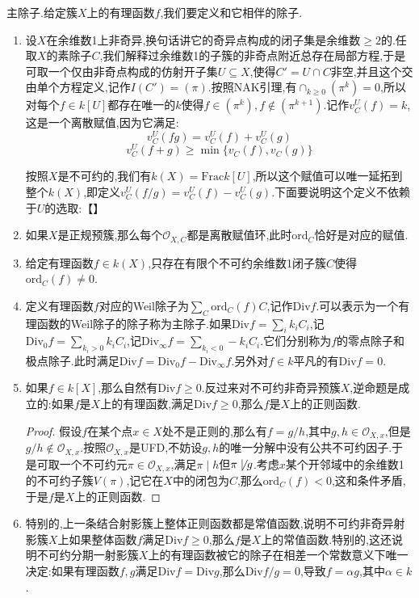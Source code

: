 主除子.给定簇$X$上的有理函数$f$,我们要定义和它相伴的除子.
\begin{enumerate}
	\item 设$X$在余维数1上非奇异,换句话讲它的奇异点构成的闭子集是余维数$\ge2$的.任取$X$的素除子$C$,我们解释过余维数1的子簇的非奇点附近总存在局部方程,于是可取一个仅由非奇点构成的仿射开子集$U\subseteq X$,使得$C'=U\cap C$非空,并且这个交由单个方程定义,记作$I(C')=(\pi)$.按照NAK引理,有$\cap_{k\ge0}(\pi^k)=0$,所以对每个$f\in k[U]$都存在唯一的$k$使得$f\in(\pi^k),f\not\in(\pi^{k+1})$.记作$v_C^U(f)=k$,这是一个离散赋值,因为它满足:
	$$v_C^U(fg)=v_C^U(f)+v_C^U(g)$$
	$$v_C^U(f+g)\ge\min\{v_C(f),v_C(g)\}$$
	
	按照$X$是不可约的,我们有$k(X)=\mathrm{Frac}k[U]$,所以这个赋值可以唯一延拓到整个$k(X)$,即定义$v_C^U(f/g)=v_C^U(f)-v_C^U(g)$.下面要说明这个定义不依赖于$U$的选取:【】
	\item 如果$X$是正规预簇,那么每个$\mathscr{O}_{X,C}$都是离散赋值环,此时$\mathrm{ord}_C$恰好是对应的赋值.
	\item 给定有理函数$f\in k(X)$,只存在有限个不可约余维数1闭子簇$C$使得$\mathrm{ord}_C(f)\not=0$.
	\item 定义有理函数$f$对应的Weil除子为$\sum_C\mathrm{ord}_C(f)C$,记作$\mathrm{Div}f$.可以表示为一个有理函数的Weil除子的除子称为主除子.如果$\mathrm{Div}f=\sum_ik_iC_i$,记$\mathrm{Div}_0f=\sum_{k_i>0}k_iC_i$,记$\mathrm{Div}_{\infty}f=\sum_{k_i<0}-k_iC_i$.它们分别称为$f$的零点除子和极点除子.此时满足$\mathrm{Div}f=\mathrm{Div}_0f-\mathrm{Div}_{\infty}f$.另外对$f\in k$平凡的有$\mathrm{Div}f=0$.
	\item 如果$f\in k[X]$,那么自然有$\mathrm{Div}f\ge0$.反过来对不可约非奇异预簇$X$,逆命题是成立的:如果$f$是$X$上的有理函数,满足$\mathrm{Div}f\ge0$,那么$f$是$X$上的正则函数.
	\begin{proof}
		
		假设$f$在某个点$x\in X$处不是正则的,那么有$f=g/h$,其中$g,h\in\mathscr{O}_{X,x}$,但是$g/h\not\in\mathscr{O}_{X,x}$.按照$\mathscr{O}_{X,x}$是UFD,不妨设$g,h$的唯一分解中没有公共不可约因子.于是可取一个不可约元$\pi\in\mathscr{O}_{X,x}$,满足$\pi\mid h$但$\pi\not\mid g$.考虑$x$某个开邻域中的余维数1的不可约子簇$V(\pi)$,记它在$X$中的闭包为$C$,那么$\mathrm{ord}_C(f)<0$,这和条件矛盾,于是$f$是$X$上的正则函数.
	\end{proof}
    \item 特别的,上一条结合射影簇上整体正则函数都是常值函数,说明不可约非奇异射影簇$X$上如果整体函数$f$满足$\mathrm{Div}f\ge0$,那么$f$是$X$上的常值函数.特别的,这还说明不可约分期一射影簇$X$上的有理函数被它的除子在相差一个常数意义下唯一决定:如果有理函数$f,g$满足$\mathrm{Div}f=\mathrm{Div}g$,那么$\mathrm{Div}f/g=0$,导致$f=\alpha g$,其中$\alpha\in k$.
\end{enumerate}

